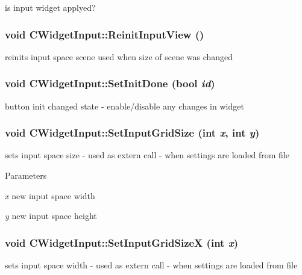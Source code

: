 is input widget applyed? \hypertarget{classCWidgetInput_a6cfb1a08d26184ca978e429e598a1b05}{
\subsubsection[{ReinitInputView}]{\setlength{\rightskip}{0pt plus 5cm}void CWidgetInput::ReinitInputView ()}}
\label{classCWidgetInput_a6cfb1a08d26184ca978e429e598a1b05}
reinits input space scene used when size of scene was changed \hypertarget{classCWidgetInput_ab20a7e7c2209a646e1344da181ed3b4c}{
\subsubsection[{SetInitDone}]{\setlength{\rightskip}{0pt plus 5cm}void CWidgetInput::SetInitDone (bool {\em id})}}
\label{classCWidgetInput_ab20a7e7c2209a646e1344da181ed3b4c}
button init changed state -\/ enable/disable any changes in widget \hypertarget{classCWidgetInput_a53c69e51933f81dee38ce9eb7c935c70}{
\subsubsection[{SetInputGridSize}]{\setlength{\rightskip}{0pt plus 5cm}void CWidgetInput::SetInputGridSize (int {\em x}, \/  int {\em y})}}
\label{classCWidgetInput_a53c69e51933f81dee38ce9eb7c935c70}
sets input space size -\/ used as extern call -\/ when settings are loaded from file


\begin{DoxyParams}{Parameters}
\item[{\em x}]new input space width \item[{\em y}]new input space height \end{DoxyParams}
\hypertarget{classCWidgetInput_a1b9d9ef0878868858b802f1fb1272693}{
\subsubsection[{SetInputGridSizeX}]{\setlength{\rightskip}{0pt plus 5cm}void CWidgetInput::SetInputGridSizeX (int {\em x})}}
\label{classCWidgetInput_a1b9d9ef0878868858b802f1fb1272693}
sets input space width -\/ used as extern call -\/ when settings are loaded from file



